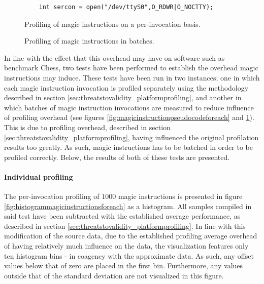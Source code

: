 \begin{figure}
  \centering
  \begin{lstlisting}
    int sercon = open("/dev/ttyS0",O_RDWR|O_NOCTTY);
  \end{lstlisting}
  \begin{minipage}{.5\textwidth}
    \centering
    
    \caption[Pseudocode - magic instruction profiling, per-invocation]{Profiling of magic instructions on a per-invocation basis.}
    \label{fig:magicinstructionpseudocodeforeach}
  \end{minipage}%
  \begin{minipage}{.5\textwidth}
    \centering
    
    \caption[Pseudocode - magic instruction profiling, per-batch]{Profiling of magic instructions in batches.}
    \label{fig:magicinstructionpseudocodeforall}
  \end{minipage}
\end{figure}


In line with the effect that this overhead may have on software such as benchmark Chess, two tests have been performed to establish the overhead magic instructions may induce.
These tests have been run in two instances; one in which each magic instruction invocation is profiled separately using the methodology described in section \ref{sec:threatstovalidity_platformprofiling}, and another in which batches of magic instruction invocations are measured to reduce influence of profiling overhead (see figures \ref{fig:magicinstructionpseudocodeforeach} and \ref{fig:magicinstructionpseudocodeforall}).
This is due to profiling overhead, described in section \ref{sec:threatstovalidity_platformprofiling}, having influenced the original profilation results too greatly.
As such, magic instructions has to be batched in order to be profiled correctly.
Below, the results of both of these tests are presented.

\paragraph{Individual profiling}
\label{par:results_magicinstructionoverhead_individualprofiling}
The per-invocation profiling of $1000$ magic instructions is presented in figure \ref{fig:histogrammagicinstructionsforeach} as a histogram.
All samples compiled in said test have been subtracted with the established average performance, as described in section \ref{sec:threatstovalidity_platformprofiling}.
In line with this modification of the source data, due to the established profiling average overhead of  having relatively much influence on the data, the visualization features only ten histogram bins - in coagency with the approximate data.
As such, any offset values below that of zero are placed in the first bin.
Furthermore, any values outside that of the standard deviation are not visualized in this figure.

